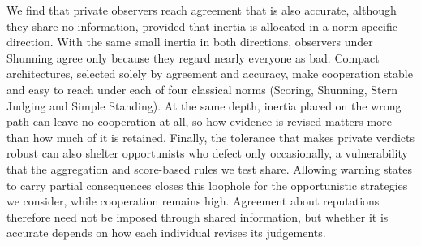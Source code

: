 We find that private observers reach agreement that is also accurate, although they share no information, provided that inertia is allocated in a norm-specific direction. With the same small inertia in both directions, observers under Shunning agree only because they regard nearly everyone as bad. Compact architectures, selected solely by agreement and accuracy, make cooperation stable and easy to reach under each of four classical norms (Scoring, Shunning, Stern Judging and Simple Standing). At the same depth, inertia placed on the wrong path can leave no cooperation at all, so how evidence is revised matters more than how much of it is retained. Finally, the tolerance that makes private verdicts robust can also shelter opportunists who defect only occasionally, a vulnerability that the aggregation and score-based rules we test share. Allowing warning states to carry partial consequences closes this loophole for the opportunistic strategies we consider, while cooperation remains high. Agreement about reputations therefore need not be imposed through shared information, but whether it is accurate depends on how each individual revises its judgements.
